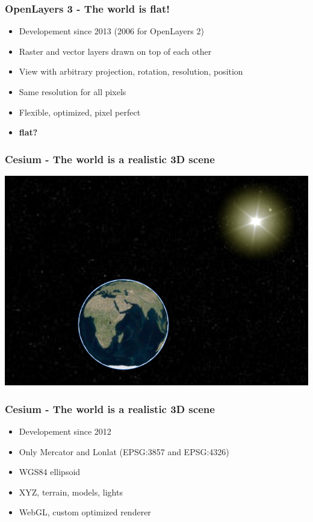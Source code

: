 \documentclass[handout]{beamer}
\begin{document}
  \begin{frame}
    \frametitle{OpenLayers 3 - The world is flat!}
    \begin{itemize}
      \item Developement since 2013 (2006 for OpenLayers 2)
      \item Raster and vector layers drawn on top of each other
      \item View with arbitrary projection, rotation, resolution, position
      \item Same resolution for all pixels
      \item Flexible, optimized, pixel perfect
      \item \textbf{flat?}
     \end{itemize}
  \end{frame}


  \begin{frame}
    \frametitle{Cesium - The world is a realistic 3D scene}
    \begin{center}
     \includegraphics[width=.7\linewidth]{./images/round_earth2.png}
    \end{center}
    \end{frame}


  \begin{frame}
    \frametitle{Cesium - The world is a realistic 3D scene}
    \begin{itemize}
      \item Developement since 2012
      \item Only Mercator and Lonlat (EPSG:3857 and EPSG:4326)
      \item WGS84 ellipsoid
      \item XYZ, terrain, models, lights
      \item WebGL, custom optimized renderer
    \end{itemize}
  \end{frame}
\end{document}
